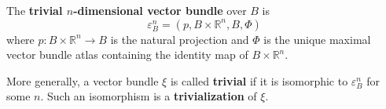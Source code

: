 The \textbf{trivial $n$-dimensional vector bundle} over $B$ is
$$\varepsilon_B^n = (p, B \times \mathbb{R}^n, B, \Phi)$$
where $p: B \times \mathbb{R}^n \to B$ is the natural projection and $\Phi$ is the unique maximal vector bundle atlas containing the identity map of $B \times \mathbb{R}^n$.

More generally, a vector bundle $\xi$ is called \textbf{trivial} if it is isomorphic to $\varepsilon_B^n$ for some $n$. Such an isomorphism is a \textbf{trivialization} of $\xi$.
